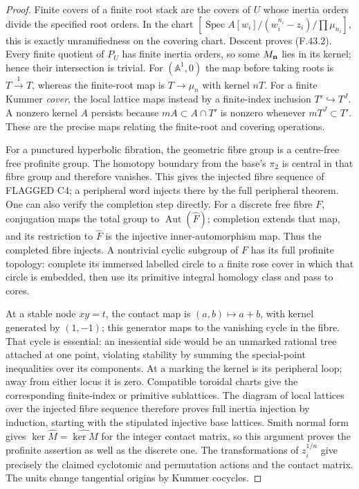 \begin{proof}
Finite covers of a finite root stack are the covers of $U$
whose inertia orders divide the specified root orders. In
the chart $[\operatorname{Spec}A[w_i]/(w_i^{n_i}-z_i)/
\prod\mu_{n_i}]$, this is exactly unramifiedness on the
covering chart. Descent proves (F.43.2). Every finite
quotient of $P_U$ has finite inertia orders, so some
$M_{\bf n}$ lies in its kernel; hence their intersection
is trivial. For $(\mathbb A^1,0)$ the map before taking
roots is $T\xrightarrow{1}T$, whereas the finite-root
map is $T\to\mu_n$ with kernel $nT$. For a finite Kummer
\emph{cover}, the local lattice maps instead by a finite-index
inclusion $T'\hookrightarrow T^J$. A nonzero kernel $A$
persists because $mA\subset A\cap T'$ is nonzero whenever
$mT^J\subset T'$. These are the precise maps relating
the finite-root and covering operations.

For a punctured hyperbolic fibration, the geometric fibre
group is a centre-free free profinite group. The homotopy
boundary from the base's $\pi_2$ is central in that fibre
group and therefore vanishes. This gives the injected
fibre sequence of FLAGGED C4; a peripheral word injects
there by the full peripheral theorem. One can also verify
the completion step directly. For a discrete free fibre
$F$, conjugation maps the total group to
$\operatorname{Aut}(\widehat F)$; completion extends that
map, and its restriction to $\widehat F$ is the injective
inner-automorphism map. Thus the completed fibre injects.
A nontrivial cyclic subgroup of $F$ has its full profinite
topology: complete its immersed labelled circle to a finite
rose cover in which that circle is embedded, then use its
primitive integral homology class and pass to cores.

At a stable node $xy=t$, the contact map is
$(a,b)\mapsto a+b$, with kernel generated by $(1,-1)$;
this generator maps to the vanishing cycle in the fibre.
That cycle is essential: an inessential side would be an
unmarked rational tree attached at one point, violating
stability by summing the special-point inequalities over
its components. At a marking the kernel is its peripheral
loop; away from either locus it is zero. Compatible
toroidal charts give the corresponding finite-index or
primitive sublattices. The diagram of local lattices over
the injected fibre sequence therefore proves full inertia
injection by induction, starting with the stipulated
injective base lattices. Smith normal form gives
$\ker\widehat M=\widehat{\ker M}$ for the integer contact
matrix, so this argument proves the profinite assertion
as well as the discrete one. The transformations of
$z_i^{1/n}$ give precisely the claimed cyclotomic and
permutation actions and the contact matrix. The units
change tangential origins by Kummer cocycles.


\end{proof}
